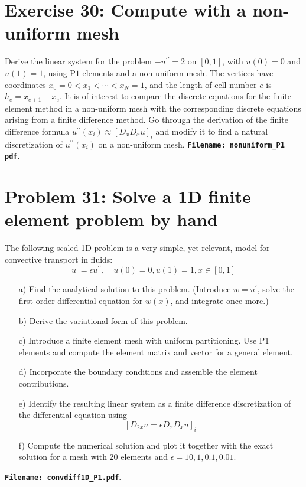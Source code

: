 \documentclass[../main.tex]{subfiles}
\begin{document}
	\section*{Exercise 30: Compute with a non-uniform mesh}
		\noindent Derive the linear system for the problem $-u^{\prime \prime}=2$ on $[0,1]$, with $u(0)=0$ and $u(1)=1$, using $\mathrm{P} 1$ elements and a non-uniform mesh. The vertices have coordinates $x_{0}=0<x_{1}<\cdots<x_{N}=1$, and the length of cell number $e$ is $h_{e}=x_{e+1}-x_{e}$.\smallbreak
		It is of interest to compare the discrete equations for the finite element method in a non-uniform mesh with the corresponding discrete equations arising from a finite difference method. Go through the derivation of the finite difference formula $u^{\prime \prime}\left(x_{i}\right) \approx\left[D_{x} D_{x} u\right]_{i}$ and modify it to find a natural discretization of $u^{\prime \prime}\left(x_{i}\right)$ on a non-uniform mesh. \textbf{\texttt{Filename: nonuniform\_P1 pdf}}.\bigbreak		
	\section*{Problem 31: Solve a 1D finite element problem by hand}
		\noindent The following scaled 1D problem is a very simple, yet relevant, model for convective transport in fluids:
		\begin{equation}
			\label{309}
			u^{\prime}=\epsilon u^{\prime \prime}, \quad u(0)=0, u(1)=1, x \in[0,1]
		\end{equation}
		\begin{enumerate}
			\item[a)] Find the analytical solution to this problem. (Introduce $w=u^{\prime}$, solve the first-order differential equation for $w(x)$, and integrate once more.)
			\item [b)] Derive the variational form of this problem.
			\item[c)] Introduce a finite element mesh with uniform partitioning. Use P1 elements and compute the element matrix and vector for a general element.
			\item[d)] Incorporate the boundary conditions and assemble the element contributions.
			\item[e)] Identify the resulting linear system as a finite difference discretization of the differential equation using
			$$	\left[D_{2 x} u=\epsilon D_{x} D_{x} u\right]_{i} $$
			\item[f)] Compute the numerical solution and plot it together with the exact solution for a mesh with 20 elements and $\epsilon=10,1,0.1,0.01$.
		\end{enumerate}
		\textbf{\texttt{Filename: convdiff1D\_P1.pdf}}.\bigbreak 
\end{document}
